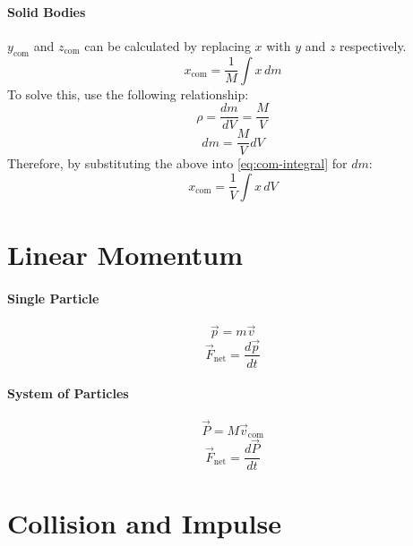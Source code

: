 \documentclass{article}
\begin{document}
        \paragraph{Solid Bodies}
        $y_{\text{com}}$ and $z_{\text{com}}$ can be calculated by replacing $x$ with $y$ and $z$ respectively.
        \begin{equation}
            x_{\text{com}} = \frac{1}{M} \int x \, dm \label{eq:com-integral}
        \end{equation}
        To solve this, use the following relationship:
        \begin{equation}
            \rho = \frac{dm}{dV} = \frac{M}{V} \nonumber
        \end{equation}
        \begin{equation}
            dm = \frac{M}{V} dV \nonumber
        \end{equation}
        Therefore, by substituting the above into \eqref{eq:com-integral} for $dm$:
        \begin{equation}
            x_{\text{com}} = \frac{1}{V} \int x \, dV
        \end{equation}

    \section{Linear Momentum}

        \paragraph{Single Particle}
        \begin{equation}
            \vec{p} = m \vec{v}
        \end{equation}
        \begin{equation}
            \vec{F}_{\text{net}} = \frac{d\vec{p}}{dt}
        \end{equation}
        \paragraph{System of Particles}
        \begin{equation}
            \vec{P} = M \vec{v}_{\text{com}}
        \end{equation}
        \begin{equation}
            \vec{F}_{\text{net}} = \frac{d\vec{P}}{dt}
        \end{equation}

    \section{Collision and Impulse}
\end{document}
